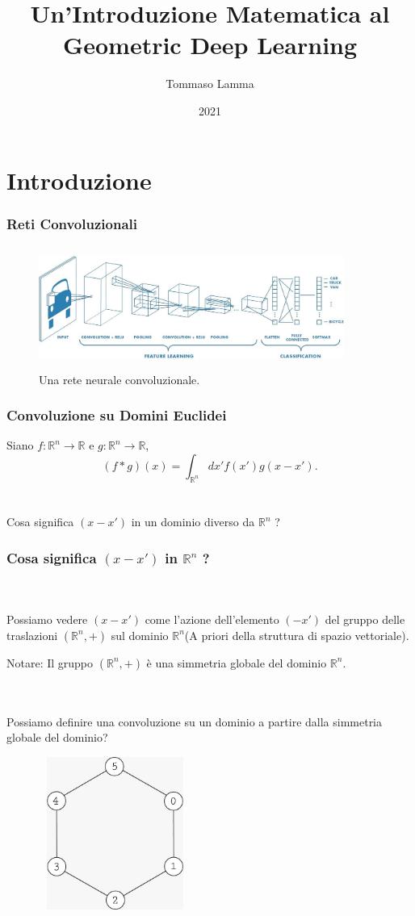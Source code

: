 \documentclass{beamer}
\title{Un'Introduzione Matematica al \\ Geometric Deep Learning}
\author{Tommaso Lamma}
\date{2021}
\newcommand{\R}{\mathbb{R}}
\begin{document}
\section{Introduzione}

\frame{\titlepage}

\begin{frame}
    \frametitle{Reti Convoluzionali}
    \begin{figure}[H]
        \centering
        \includegraphics[width=10cm, height=4cm]{cnn}
        \caption{Una rete neurale convoluzionale.}
    \end{figure}       
\end{frame}

\begin{frame}
    \frametitle{Convoluzione su Domini Euclidei}    
    Siano $f:\R^n \to \R$ e $g:\R^n \to \R$,
    \[ (f * g)(x) = \int_{\R^n} dx' f(x')g(x-x'). \]
    \hfill \\
    \hfill \\
    { \large Cosa significa $(x - x')$ in un dominio diverso da $\R^n$ ?}
\end{frame}

\begin{frame}
    \frametitle{ \large Cosa significa $(x - x')$ \textbf{in} $\R^n$ ?}
    \hfill \\
    \hfill \\
    Possiamo vedere $( x - x')$ come l'azione dell'elemento $(-x')$ del gruppo delle traslazioni $(\R^n, +)$
    sul dominio $\R^n$(A priori della struttura di spazio vettoriale).
    \begin{block}{Notare:}
        Il gruppo $(\R^n, +)$ è una simmetria globale del dominio $\R^n$.  
    \end{block}
    \hfill \\
    \hfill \\
    {\large Possiamo definire una convoluzione su un dominio a partire dalla simmetria globale del dominio?}
\end{frame}

\begin{frame}
    \begin{figure}[H]
        \centering
        \includegraphics[width=5cm, height=5cm]{graph}
        \caption{}
    \end{figure}    
\end{frame}
\end{document}
